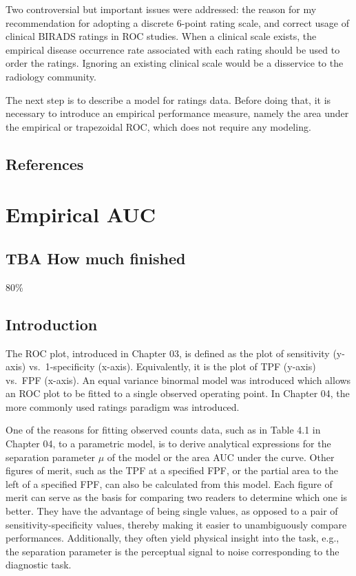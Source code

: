 \documentclass[
]{book}
\begin{document}
Two controversial but important issues were addressed: the reason for my recommendation for adopting a discrete 6-point rating scale, and correct usage of clinical BIRADS ratings in ROC studies. When a clinical scale exists, the empirical disease occurrence rate associated with each rating should be used to order the ratings. Ignoring an existing clinical scale would be a disservice to the radiology community.

The next step is to describe a model for ratings data. Before doing that, it is necessary to introduce an empirical performance measure, namely the area under the empirical or trapezoidal ROC, which does not require any modeling.

\hypertarget{ratings-paradigm-references}{%
\section{References}\label{ratings-paradigm-references}}

\hypertarget{empirical-auc}{%
\chapter{Empirical AUC}\label{empirical-auc}}

\hypertarget{empirical-auc-how-much-finished}{%
\section{TBA How much finished}\label{empirical-auc-how-much-finished}}

80\%

\hypertarget{empirical-auc-introduction}{%
\section{Introduction}\label{empirical-auc-introduction}}

The ROC plot, introduced in Chapter 03, is defined as the plot of sensitivity (y-axis) vs.~1-specificity (x-axis). Equivalently, it is the plot of TPF (y-axis) vs.~FPF (x-axis). An equal variance binormal model was introduced which allows an ROC plot to be fitted to a single observed operating point. In Chapter 04, the more commonly used ratings paradigm was introduced.

One of the reasons for fitting observed counts data, such as in Table 4.1 in Chapter 04, to a parametric model, is to derive analytical expressions for the separation parameter \(\mu\) of the model or the area AUC under the curve. Other figures of merit, such as the TPF at a specified FPF, or the partial area to the left of a specified FPF, can also be calculated from this model. Each figure of merit can serve as the basis for comparing two readers to determine which one is better. They have the advantage of being single values, as opposed to a pair of sensitivity-specificity values, thereby making it easier to unambiguously compare performances. Additionally, they often yield physical insight into the task, e.g., the separation parameter is the perceptual signal to noise corresponding to the diagnostic task.
\end{document}
